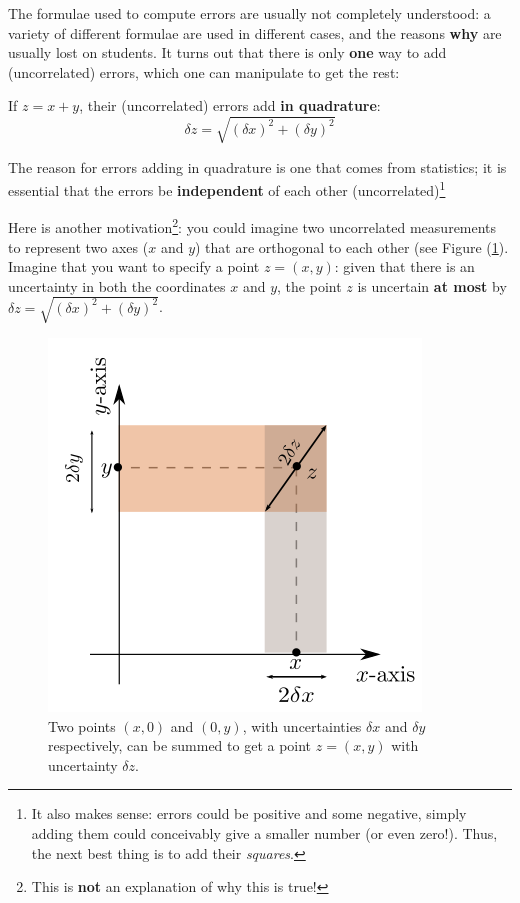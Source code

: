 The formulae used to compute errors are usually not completely understood: a variety of different formulae are used in different cases, and the reasons \textbf{why} are usually lost on students. It turns out that there is only \textbf{one} way to add (uncorrelated) errors, which one can manipulate to get the rest:

\begin{imp}
If $z = x + y$, their (uncorrelated) errors add \textbf{in quadrature}:
\begin{equation}
    \delta z = \sqrt{\left(\delta x\right)^2+\left(\delta y\right)^2}
    \label{quadrature}
\end{equation}
\end{imp}

The reason for errors adding in quadrature is one that comes from statistics; it is essential that the errors be \textbf{independent} of each other (uncorrelated)\footnote{It also makes sense:  errors could be positive and some negative, simply adding them could conceivably give a smaller number (or even zero!). Thus, the next best thing is to add their \textit{squares}. }

Here is another motivation\footnote{This is \textbf{not} an explanation of why this is true!}: you could imagine two uncorrelated measurements to represent two axes ($x$ and $y$) that are orthogonal to each other (see Figure (\ref{fig:quadrature}). Imagine that you want to specify a point $z = (x,y)$: given that there is an uncertainty in both the coordinates $x$ and $y$, the point $z$ is uncertain \textbf{at most} by $\delta z = \sqrt{\left(\delta x\right)^2+\left(\delta y\right)^2}$.

\begin{figure}
    \centering
    \includegraphics[scale=0.5]{figs/quadrature.png}
    \caption{Two points $(x,0)$ and $(0,y)$, with uncertainties $\delta x$ and $\delta y$ respectively, can be summed to get a point $z=(x,y)$ with uncertainty $\delta z$. }
    \label{fig:quadrature}
\end{figure}


